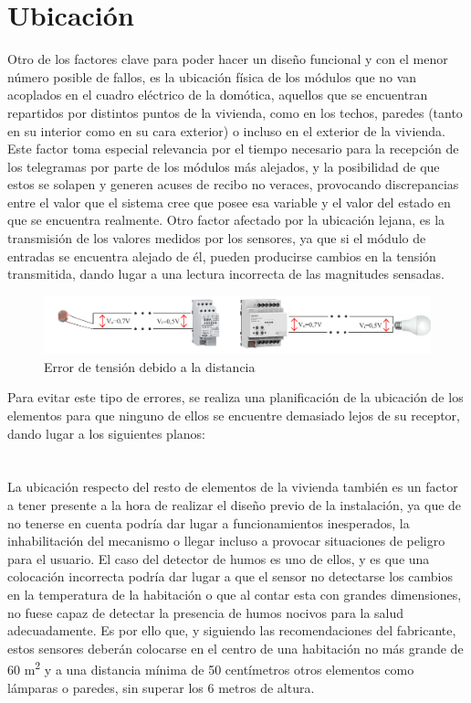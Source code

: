 \section{Ubicación}

Otro de los factores clave para poder hacer un diseño funcional y con el menor número posible de fallos, es la ubicación física de los módulos que no van acoplados en el cuadro eléctrico de la domótica, aquellos que se encuentran repartidos por distintos puntos de la vivienda, como en los techos, paredes (tanto en su interior como en su cara exterior) o incluso en el exterior de la vivienda. Este factor toma especial relevancia por el tiempo necesario para la recepción de los telegramas por parte de los módulos más alejados, y la posibilidad de que estos se solapen y generen acuses de recibo no veraces, provocando discrepancias entre el valor que el sistema cree que posee esa variable y el valor del estado en que se encuentra realmente. Otro factor afectado por la ubicación lejana, es la transmisión de los valores medidos por los sensores, ya que si el módulo de entradas se encuentra alejado de él, pueden producirse cambios en la tensión transmitida, dando lugar a una lectura incorrecta de las magnitudes sensadas.
\begin{figure}[H]
\begin{center}
\includegraphics[width=1.15\textwidth]{figures/caida_tension.png}   
\caption{Error de tensión debido a la distancia}
\label{fig:caida_tension}
\end{center}
\end{figure}
Para evitar este tipo de errores, se realiza una planificación de la ubicación de los elementos para que ninguno de ellos se encuentre demasiado lejos de su receptor, dando lugar a los siguientes planos:\\\\\\
La ubicación respecto del resto de elementos de la vivienda también es un factor a tener presente a la hora de realizar el diseño previo de la instalación, ya que de no tenerse en cuenta podría dar lugar a funcionamientos inesperados, la inhabilitación del mecanismo o llegar incluso a provocar situaciones de peligro para el usuario. El caso del detector de humos es uno de ellos, y es que una colocación incorrecta podría dar lugar a que el sensor no detectarse los cambios en la temperatura de la habitación o que al contar esta con grandes dimensiones, no fuese capaz de detectar la presencia de humos nocivos para la salud adecuadamente. Es por ello que, y siguiendo las recomendaciones del fabricante, estos sensores deberán colocarse en el centro de una habitación no más grande de 60 m\textsuperscript{2} y a una distancia mínima de 50 centímetros  otros elementos como lámparas o paredes, sin superar los 6 metros de altura. \\\\
